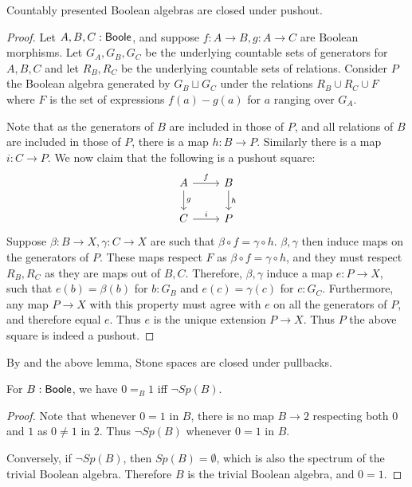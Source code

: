 \begin{lemma}\label{BoolePushouts}
  Countably presented Boolean algebras are closed under pushout. 
\end{lemma} 
\begin{proof}
  Let $A,B,C:\mathsf{Boole}$, and suppose $f:A\to B, g:A \to C$ are Boolean morphisms. 
  Let $G_A,G_B,G_C$ be the underlying countable sets of generators for $A,B,C$ and 
  let $R_B,R_C$ be the underlying countable sets of relations. 
  Consider $P$ the Boolean algebra generated by $G_B\sqcup G_C$ under the relations 
  $R_B\cup R_C \cup F$ where $F$ is the set of expressions $f(a)-g(a)$ for $a$ ranging over $G_A$. 
  
  Note that as the generators of $B$ are included in those of $P$, 
  and all relations of $B$ are included in those of $P$, there is a map $h:B\to P$. 
  Similarly there is a map $i:C\to P$. 
  We now claim that the following is a pushout square:
  \begin{equation}\begin{tikzcd}
    A \arrow[r,"f"] \arrow[d,"g"] & B \arrow[d,"h"]\\
    C \arrow[r,"i"] & P
  \end{tikzcd}\end{equation}  
  Suppose $\beta:B \to X, \gamma:C\to X$ are such that $\beta\circ f = \gamma \circ h$. 
  $\beta,\gamma$ then induce maps on the generators of $P$. 
  These maps respect $F$ as $\beta\circ f=\gamma\circ h$, and they must respect $R_B,R_C$ as they are maps out of $B,C$. 
  Therefore, $\beta,\gamma$ induce a map $e:P\to X$, such that 
  $e(b) = \beta(b)$ for $b:G_B$ and $e(c)=\gamma(c)$ for $c:G_C$. 
  Furthermore, any map $P\to X$ with this property must agree with $e$ on all the generators of $P$, 
  and therefore equal $e$. Thus $e$ is the unique extension $P\to X$. 
  Thus $P$ the above square is indeed a pushout. 
\end{proof}
\begin{corollary}
  By  and the above lemma, Stone spaces are closed under pullbacks. 
\end{corollary}


\begin{lemma}
  For $B:\mathsf{Boole}$, we have $0=_B1$ iff $\neg Sp(B)$.
\end{lemma}
\begin{proof}
  Note that whenever $0=1$ in $B$, there is no map $B\to 2$ respecting both $0$ and $1$ as $0\neq 1$ in $2$. 
  Thus $\neg Sp(B)$ whenever $0=1$ in $B$. 
  
  Conversely, if $\neg Sp(B)$, then $Sp(B) = \emptyset$, which is also the spectrum of the trivial Boolean algebra. 
  Therefore $B$ is the trivial Boolean algebra, and $0=1$. 
\end{proof}

